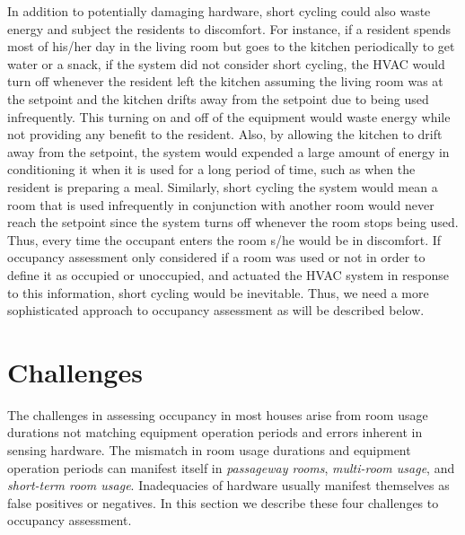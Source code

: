 In addition to potentially damaging hardware, short cycling could also waste
energy and subject the residents to discomfort. For instance, if a resident
spends most of his/her day in the living room but goes to the kitchen
periodically to get water or a snack, if the system did not consider short
cycling, the HVAC would turn off whenever the resident left the kitchen assuming
the living room was at the setpoint and the kitchen drifts away from the
setpoint due to being used infrequently. This turning on and off of the
equipment would waste energy while not providing any benefit to the
resident. Also, by allowing the kitchen to drift away from the setpoint, the
system would expended a large amount of energy in conditioning it when it is
used for a long period of time, such as when the resident is preparing a
meal. Similarly, short cycling the system would mean a room that is used
infrequently in conjunction with another room would never reach the setpoint
since the system turns off whenever the room stops being used. Thus, every time
the occupant enters the room s/he would be in discomfort. If occupancy
assessment only considered if a room was used or not in order to define it as
occupied or unoccupied, and actuated the HVAC system in response to this
information, short cycling would be inevitable. Thus, we need a more
sophisticated approach to occupancy assessment as will be described below. 

\section{Challenges}
\label{sec:occupancyAssessmentChallenges}

The challenges in assessing occupancy in most houses arise from room usage
durations not matching equipment operation periods and errors inherent in
sensing hardware. The mismatch in room usage durations and equipment operation
periods can manifest itself in {\em passageway rooms}, {\em multi-room usage},
 and {\em short-term room usage}. Inadequacies of hardware usually manifest
 themselves as false positives or negatives. In this section we describe these
 four challenges to occupancy assessment.

